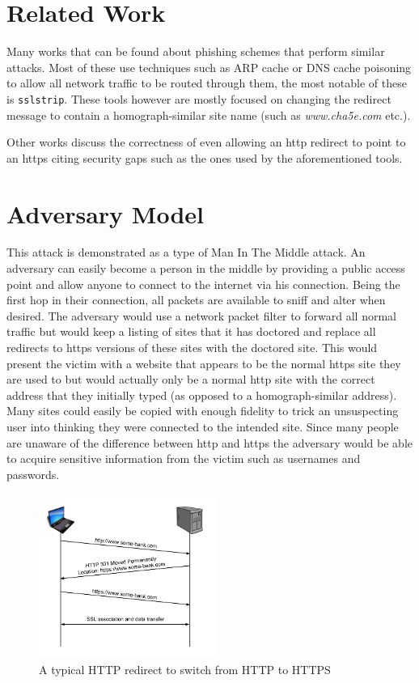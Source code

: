 \documentclass{article}
\begin{document}
\section{Related Work}
Many works that can be found about phishing schemes that perform similar attacks.  Most of these use techniques such as ARP cache or DNS cache poisoning to allow all network traffic to be routed through them, the most notable of these is \texttt{sslstrip}\cite{sslstrip}.  These tools however are mostly focused on changing the redirect message to contain a homograph-similar site name (such as {\em www.cha5e.com} etc.).

Other works discuss the correctness of even allowing an http redirect to point
to an https citing security gaps such as the ones used by the aforementioned
tools.

\section{Adversary Model}
This attack is demonstrated as a type of Man In The Middle attack.  An adversary can easily become a person in the middle by providing a public access point and allow anyone to connect to the internet via his connection.  Being the first hop in their connection, all packets are available to sniff and alter when desired.  The adversary would use a network packet filter to forward all normal traffic but would keep a listing of sites that it has doctored and replace all redirects to https versions of these sites with the doctored site.  This would present the victim with a website that appears to be the normal https site they are used to but would actually only be a normal http site with the correct address that they initially typed (as opposed to a homograph-similar address).  Many sites could easily be copied with enough fidelity to trick an unsuspecting user into thinking they were connected to the intended site.  Since many people are unaware of the difference between http and https the adversary would be able to acquire sensitive information from the victim such as usernames and passwords.

\begin{figure}[t]
\begin{center}

\includegraphics[width=2.3in]{normal_redirect.png} 
\caption{A typical HTTP redirect to switch from HTTP to HTTPS} 
\label{fg:redirect}

\end{center}
\end{figure}
\end{document}
